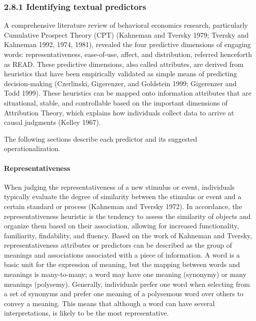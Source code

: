 \documentclass[
]{book}
\author{}
\date{}
\begin{document}
\frontmatter

\mainmatter
\subsubsection{2.8.1 Identifying textual predictors}\label{identifying-textual-predictors}

A comprehensive literature review of behavioral economics research, particularly Cumulative Prospect Theory (CPT) (Kahneman and Tversky 1979; Tversky and Kahneman 1992, 1974, 1981), revealed the four predictive dimensions of engaging words: representativeness, ease-of-use, affect, and distribution, referred henceforth as READ. These predictive dimensions, also called attributes, are derived from heuristics that have been empirically validated as simple means of predicting decision-making (Czerlinski, Gigerenzer, and Goldstein 1999; Gigerenzer and Todd 1999). These heuristics can be mapped onto information attributes that are situational, stable, and controllable based on the important dimensions of Attribution Theory, which explains how individuals collect data to arrive at causal judgments (Kelley 1967).

The following sections describe each predictor and its suggested operationalization.

\paragraph{Representativeness}\label{representativeness}

When judging the representativeness of a new stimulus or event, individuals typically evaluate the degree of similarity between the stimulus or event and a certain standard or process (Kahneman and Tversky 1972). In accordance, the representativeness heuristic is the tendency to assess the similarity of objects and organize them based on their association, allowing for increased functionality, familiarity, findability, and fluency. Based on the work of Kahneman and Tversky, representativeness attributes or predictors can be described as the group of meanings and associations associated with a piece of information. A word is a basic unit for the expression of meaning, but the mapping between words and meanings is many-to-many; a word may have one meaning (synonymy) or many meanings (polysemy). Generally, individuals prefer one word when selecting from a set of synonyms and prefer one meaning of a polysemous word over others to convey a meaning. This means that although a word can have several interpretations, is likely to be the most representative.
\end{document}
